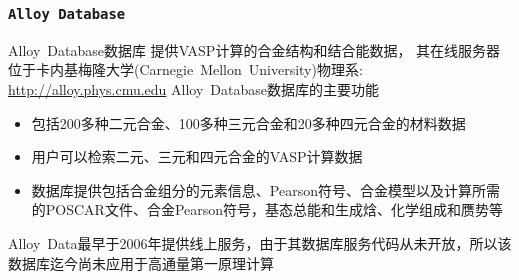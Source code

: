 \frame
{
\frametitle{\tt{Alloy Database}}
\textrm{Alloy~Database}数据库
提供\textrm{VASP}计算的合金结构和结合能数据，%
其在线服务器位于卡内基梅隆大学\textrm{(Carnegie~Mellon~University)}物理系:
\url{http://alloy.phys.cmu.edu}
\vskip 3pt
\textrm{Alloy~Database}数据库的主要功能
\begin{itemize}
    \setlength{\itemsep}{5pt}
	\item 包括\textrm{200}多种二元合金、\textrm{100}多种三元合金和\textrm{20}多种四元合金的材料数据
	\item 用户可以检索二元、三元和四元合金的\textrm{VASP}计算数据
	\item 数据库提供包括合金组分的元素信息、\textrm{Pearson}符号、合金模型以及计算所需的\textrm{POSCAR}文件、合金\textrm{Pearson}符号，基态总能和生成焓、化学组成和赝势等
\end{itemize}
\textrm{Alloy~Data}最早于\textrm{2006}年提供线上服务，由于其数据库服务代码从未开放，所以该数据库迄今尚未应用于高通量第一原理计算
}

